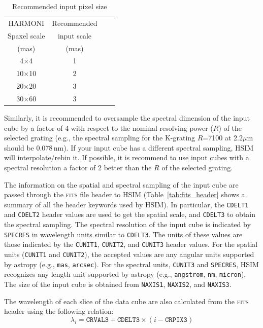 \documentclass[12pt]{report}
\begin{document}
\begin{table}[h]
\centering
\caption{Recommended input pixel size}
\label{tab:scale}
\begin{tabular}{cccc}
\hline
HARMONI & Recommended\\
Spaxel scale & input scale\\
(mas) & (mas) \\
\hline
4$\times$4   & 1 \\
10$\times$10 & 2 \\
20$\times$20 & 3 \\
30$\times$60 & 3 \\
\hline
\end{tabular}
\end{table}

Similarly, it is recommended to oversample the spectral dimension of the input cube by a factor of 4 with respect to the nominal resolving power ($R$) of the selected grating (e.g., the spectral sampling for the K-grating $R$=7100 at 2.2$\mu$m should be 0.078\,nm). If your input cube has a different spectral sampling, HSIM will interpolate\slash rebin it. If possible, it is recommend to use input cubes with a spectral resolution a factor of 2 better than the $R$ of the selected grating.

The information on the spatial and spectral sampling of the input cube are passed through the \textsc{fits} file header to HSIM (Table~\ref{tab:fits_header} shows a summary of all the header keywords used by HSIM). In particular, the \texttt{CDELT1} and \texttt{CDELT2} header values are used to get the spatial scale, and \texttt{CDELT3} to obtain the spectral sampling. The spectral resolution of the input cube is indicated by \texttt{SPECRES} in wavelength units similar to \texttt{CDELT3}. The units of these values are those indicated by the \texttt{CUNIT1}, \texttt{CUNIT2}, and \texttt{CUNIT3} header values. For the spatial units (\texttt{CUNIT1} and \texttt{CUNIT2}), the accepted values are any angular units supported by astropy (e.g., \texttt{mas}, \texttt{arcsec}). For the spectral units, \texttt{CUNIT3} and \texttt{SPECRES}, HSIM recognizes any length unit supported by astropy (e.g., \texttt{angstrom}, \texttt{nm}, \texttt{micron}). The size of the input cube is obtained from \texttt{NAXIS1}, \texttt{NAXIS2}, and \texttt{NAXIS3}.


The wavelength of each slice of the data cube are also calculated from the \textsc{fits} header using the following relation:
\begin{equation}\label{eq:lambda}
\lambda_i = \texttt{CRVAL3} + \texttt{CDELT3} \times (i - \texttt{CRPIX3})
\end{equation}
\end{document}
